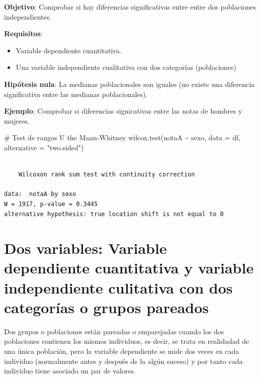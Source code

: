 \documentclass[
  spanish,
  a4paper,
]{scrreport}
\newenvironment{Shaded}{\begin{snugshade}}{\end{snugshade}}
\newcommand{\AttributeTok}[1]{\textcolor[rgb]{0.40,0.45,0.13}{#1}}
\newcommand{\CommentTok}[1]{\textcolor[rgb]{0.37,0.37,0.37}{#1}}
\newcommand{\FunctionTok}[1]{\textcolor[rgb]{0.28,0.35,0.67}{#1}}
\newcommand{\NormalTok}[1]{\textcolor[rgb]{0.00,0.23,0.31}{#1}}
\newcommand{\SpecialCharTok}[1]{\textcolor[rgb]{0.37,0.37,0.37}{#1}}
\newcommand{\StringTok}[1]{\textcolor[rgb]{0.13,0.47,0.30}{#1}}
\providecommand{\tightlist}{%
  \setlength{\itemsep}{0pt}\setlength{\parskip}{0pt}}
\theoremstyle{definition}
\theoremstyle{definition}
\theoremstyle{remark}
\begin{document}
\textbf{Objetivo}: Comprobar si hay diferencias significativas entre
entre dos poblaciones independientes.

\textbf{Requisitos}:

\begin{itemize}
\tightlist
\item
  Variable dependiente cuantitativa.
\item
  Una variable independiente cualitativa con dos categorías
  (poblaciones)
\end{itemize}

\textbf{Hipótesis nula}: La medianas poblacionales son iguales (no
existe una diferencia significativa entre las medianas poblacionales).

\textbf{Ejemplo}: Comprobar si diferencias signicativas entre las notas
de hombres y mujeres.

\begin{Shaded}
\begin{Highlighting}[]
\CommentTok{\# Test de rangos U the Mann{-}Whitney}
\FunctionTok{wilcox.test}\NormalTok{(notaA }\SpecialCharTok{\textasciitilde{}}\NormalTok{ sexo, }\AttributeTok{data =}\NormalTok{ df, }\AttributeTok{alternative =} \StringTok{"two.sided"}\NormalTok{)}
\end{Highlighting}
\end{Shaded}

\begin{verbatim}

    Wilcoxon rank sum test with continuity correction

data:  notaA by sexo
W = 1917, p-value = 0.3445
alternative hypothesis: true location shift is not equal to 0
\end{verbatim}

\section{Dos variables: Variable dependiente cuantitativa y variable
independiente culitativa con dos categorías o grupos
pareados}\label{dos-variables-variable-dependiente-cuantitativa-y-variable-independiente-culitativa-con-dos-categoruxedas-o-grupos-pareados}

Dos grupos o poblaciones están pareadas o emparejadas cuando los dos
poblaciones contienen los mismos individuos, es decir, se trata en
realidadad de una única población, pero la variable dependiente se mide
dos veces en cada individuo (normalmente antes y después de la algún
suceso) y por tanto cada individuo tiene asociado un par de valores.
\end{document}
